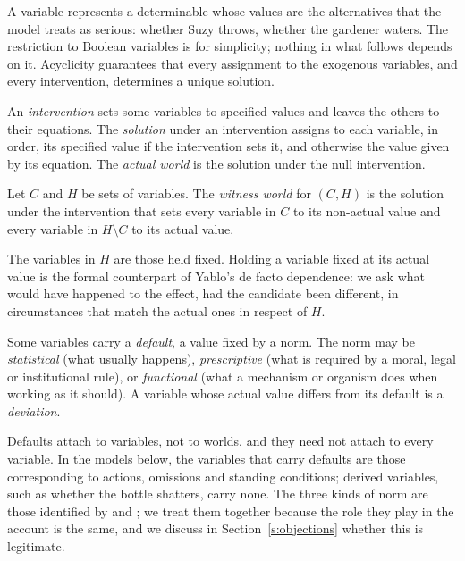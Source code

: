 \documentclass{situationist-preprint}
\begin{document}
A variable represents a determinable whose values are the alternatives that the model treats as serious: whether Suzy throws, whether the gardener waters. The restriction to Boolean variables is for simplicity; nothing in what follows depends on it. Acyclicity guarantees that every assignment to the exogenous variables, and every intervention, determines a unique solution.

\begin{definition}\label{d:solution}
An \emph{intervention} sets some variables to specified values and leaves the others to their equations. The \emph{solution} under an intervention assigns to each variable, in order, its specified value if the intervention sets it, and otherwise the value given by its equation. The \emph{actual world} is the solution under the null intervention.
\end{definition}

\begin{definition}\label{d:witness}
Let $C$ and $H$ be sets of variables. The \emph{witness world} for $(C, H)$ is the solution under the intervention that sets every variable in $C$ to its non-actual value and every variable in $H \setminus C$ to its actual value.
\end{definition}

The variables in $H$ are those held fixed. Holding a variable fixed at its actual value is the formal counterpart of Yablo's de facto dependence: we ask what would have happened to the effect, had the candidate been different, in circumstances that match the actual ones in respect of $H$.

\begin{definition}[Defaults]\label{d:default}
Some variables carry a \emph{default}, a value fixed by a norm. The norm may be \emph{statistical} (what usually happens), \emph{prescriptive} (what is required by a moral, legal or institutional rule), or \emph{functional} (what a mechanism or organism does when working as it should). A variable whose actual value differs from its default is a \emph{deviation}.
\end{definition}

Defaults attach to variables, not to worlds, and they need not attach to every variable. In the models below, the variables that carry defaults are those corresponding to actions, omissions and standing conditions; derived variables, such as whether the bottle shatters, carry none. The three kinds of norm are those identified by \citet{HitchcockKnobe2009} and \citet{HalpernHitchcock2015}; we treat them together because the role they play in the account is the same, and we discuss in Section~\ref{s:objections} whether this is legitimate.
\end{document}

